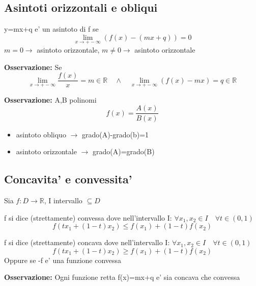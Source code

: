 \documentclass{article}
\begin{document}
        \subsection{Asintoti orizzontali e obliqui}
        \begin{flushleft}
          y=mx+q e' un asintoto di f se
          \begin{equation}
            \lim_{x \to +-\infty} (f(x)-(mx+q))=0
          \end{equation}
          $m=0 \to $ asintoto orizzontale,
          $m\neq  0 \to $ asintoto orizzontale
        \end{flushleft}
        \begin{flushleft}
          \textbf{Osservazione:} Se
          \begin{equation}
            \lim_{x \to +-\infty} \frac{f(x)}{x} =m \in \mathbb{R} \quad \land \quad \lim_{x \to +-\infty} (f(x)-mx)=q \in \mathbb{R}
          \end{equation}
        \end{flushleft}
        \begin{flushleft}
          \textbf{Osservazione:} A,B polinomi
          \begin{equation}
            f(x)=\frac{A(x)}{B(x)}
          \end{equation}
          \begin{itemize}
            \item asintoto obliquo $\to$ grado(A)-grado(b)=1 
            \item asintoto orizzontale $\to$ grado(A)=grado(B)
          \end{itemize}
        \end{flushleft}
        \subsection{Concavita' e convessita'}
        \begin{flushleft}
          Sia $f:D \to \mathbb{R}$, I intervallo $\subseteq D$
        \end{flushleft}
        \begin{flushleft}
          f si dice (strettamente) convessa dove nell'intervallo I: $\forall x_1,x_2 \in I \quad \forall t\in(0,1)$
          \begin{equation}
            f(tx_1+(1-t)x_2) \leq f(x_1)+(1-t)f(x_2)
          \end{equation}
        \end{flushleft}
        \begin{flushleft}
          f si dice (strettamente) concava dove nell'intervallo I: $\forall x_1,x_2 \in I \quad \forall t\in(0,1)$
          \begin{equation}
            f(tx_1+(1-t)x_2) \geq f(x_1)+(1-t)f(x_2)
          \end{equation}
          Oppure se -f e' una funzione convessa
        \end{flushleft}
        \begin{flushleft}
          \textbf{Osservazione:} Ogni funzione retta f(x)=mx+q e' sia concava che convessa
        \end{flushleft}
\end{document}
